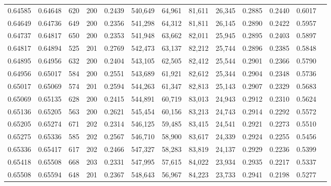 \begin{tabular}{rrrrrrrrrrrrr}
0.64585 & 0.64648 &   620 & 200 &                                     0.2439 & 540,649 &  64,961 &  81,611 &  26,345 & 0.2885 & 0.2440 & 0.6017 \\
0.64649 & 0.64736 &   649 & 200 &                                     0.2356 & 541,298 &  64,312 &  81,811 &  26,145 & 0.2890 & 0.2422 & 0.5957 \\
0.64737 & 0.64817 &   650 & 200 &                                     0.2353 & 541,948 &  63,662 &  82,011 &  25,945 & 0.2895 & 0.2403 & 0.5897 \\
0.64817 & 0.64894 &   525 & 201 &                                     0.2769 & 542,473 &  63,137 &  82,212 &  25,744 & 0.2896 & 0.2385 & 0.5848 \\
0.64895 & 0.64956 &   632 & 200 &                                     0.2404 & 543,105 &  62,505 &  82,412 &  25,544 & 0.2901 & 0.2366 & 0.5790 \\
0.64956 & 0.65017 &   584 & 200 &                                     0.2551 & 543,689 &  61,921 &  82,612 &  25,344 & 0.2904 & 0.2348 & 0.5736 \\
0.65017 & 0.65069 &   574 & 201 &                                     0.2594 & 544,263 &  61,347 &  82,813 &  25,143 & 0.2907 & 0.2329 & 0.5683 \\
0.65069 & 0.65135 &   628 & 200 &                                     0.2415 & 544,891 &  60,719 &  83,013 &  24,943 & 0.2912 & 0.2310 & 0.5624 \\
0.65136 & 0.65205 &   563 & 200 &                                     0.2621 & 545,454 &  60,156 &  83,213 &  24,743 & 0.2914 & 0.2292 & 0.5572 \\
0.65205 & 0.65274 &   671 & 202 &                                     0.2314 & 546,125 &  59,485 &  83,415 &  24,541 & 0.2921 & 0.2273 & 0.5510 \\
0.65275 & 0.65336 &   585 & 202 &                                     0.2567 & 546,710 &  58,900 &  83,617 &  24,339 & 0.2924 & 0.2255 & 0.5456 \\
0.65336 & 0.65417 &   617 & 202 &                                     0.2466 & 547,327 &  58,283 &  83,819 &  24,137 & 0.2929 & 0.2236 & 0.5399 \\
0.65418 & 0.65508 &   668 & 203 &                                     0.2331 & 547,995 &  57,615 &  84,022 &  23,934 & 0.2935 & 0.2217 & 0.5337 \\
0.65508 & 0.65594 &   648 & 201 &                                     0.2367 & 548,643 &  56,967 &  84,223 &  23,733 & 0.2941 & 0.2198 & 0.5277 \\

\end{tabular}

